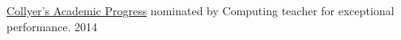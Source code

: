 
\begin{cvhonors}


  \cvhonor
    {\href{https://www.westsussextoday.co.uk/news/outstanding-students-recognised-at-collyer-s-1-6481659}{Collyer's Academic Progress}} %
    {nominated by Computing teacher for exceptional performance.} %
    {2014} %

\end{cvhonors}

